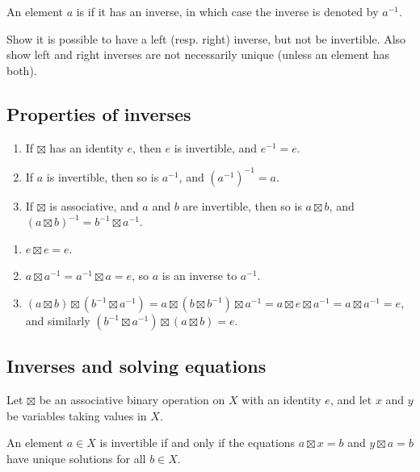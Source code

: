 \documentclass[12pt,letterpaper]{report}
\begin{document}
An element $a$ is  if it has an inverse, in which case the inverse is denoted by
$a^{-1}$.

\begin{exer}{}{}
  Show it is possible to have a left (resp. right) inverse, but not be invertible.
  Also show left and right inverses are not necessarily unique (unless an element has both).
\end{exer}

\pagebreak
\subsection{Properties of inverses}

\begin{lem}{}{}
  \begin{enumerate}
    \item
    If $\boxtimes$ has an identity $e$, then $e$ is invertible, and $e^{-1} = e$.
    \item
    If $a$ is invertible, then so is $a^{-1}$, and $(a^{-1})^{-1} = a$.
    \item
    If $\boxtimes$ is associative, and $a$ and $b$ are invertible, then so is $a \boxtimes b$, and
    $(a \boxtimes b)^{-1} = b^{-1} \boxtimes a^{-1}$.
  \end{enumerate}
\end{lem}

\begin{thmproof}
  \begin{enumerate}
    \item
    $e \boxtimes e = e$.
    \item
    $a \boxtimes a^{-1} = a^{-1} \boxtimes a = e$, so $a$ is an inverse to $a^{-1}$.
    \item
    $(a \boxtimes b) \boxtimes (b^{-1} \boxtimes a^{-1}) =
      a \boxtimes (b \boxtimes b^{-1}) \boxtimes a^{-1} = a \boxtimes e \boxtimes a^{-1} =
      a \boxtimes a^{-1} = e$,
    and similarly $(b^{-1} \boxtimes a^{-1}) \boxtimes (a \boxtimes b) = e$.
  \end{enumerate}
\end{thmproof}

\pagebreak
\subsection{Inverses and solving equations}

\begin{prop}{}{}
  Let $\boxtimes$ be an associative binary operation on $X$ with an identity $e$, and let $x$ and
  $y$ be variables taking values in $X$.

  An element $a \in X$ is invertible if and only if the equations $a \boxtimes x = b$ and
  $y \boxtimes a = b$ have unique solutions for all $b \in X$.
\end{prop}
\end{document}
